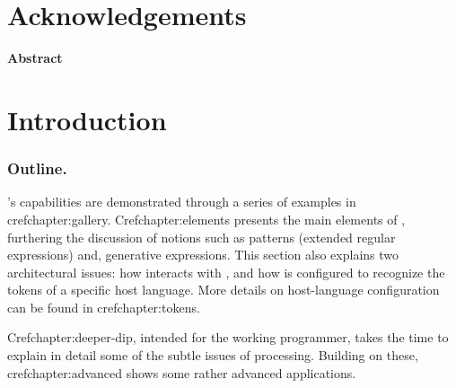 \documentclass[12pt]{book}
\begin{document}
\maketitle
\frontmatter

\chapter*{Acknowledgements}
\label{chapter:acknowledgements}


\cleardoublepage{}
\begin{centering}
  \hfill \Large\bfseries Abstract\hfill
\end{centering}
\begin{quote}
  \slshape
  \large
  
\end{quote}

\tableofcontents
\cleardoublepage{}
{}
\listoftables
\cleardoublepage{}
{}
\cleardoublepage{}
\listoffigures
\cleardoublepage{}
{}
\listofalgorithms
\cleardoublepage{}
{}
\lstlistoflistings

\mainmatter

\chapter{Introduction}
\label{chapter:introduction}


\subsection*{Outline.}
\Fajita's capabilities are demonstrated through a series of examples in
cref{chapter:gallery}. Cref{chapter:elements} presents the main elements of
  \Fajita, furthering the discussion of notions such as patterns (extended
  regular expressions) and, generative expressions.
This section also explains two architectural issues:
  how \Fajita interacts with \Python, and how \Fajita is configured to
  recognize the tokens of a specific host language.
More details on host-language configuration can be found in
cref{chapter:tokens}.

Cref{chapter:deeper-dip}, intended for the working \Fajita programmer,
  takes the time to explain in detail some of the
  subtle issues of \Fajita processing.
Building on these, cref{chapter:advanced} shows some rather
  advanced applications.
\end{document}

